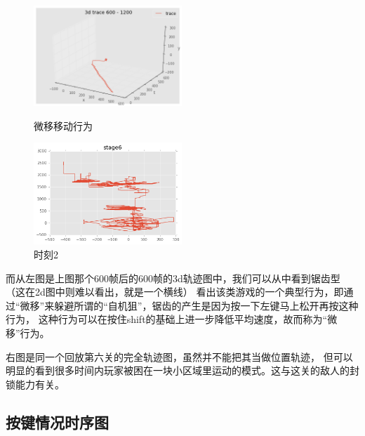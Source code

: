\documentclass[UTF8]{ctexart}
\begin{document}
\begin{figure}[H]
\begin{minipage}[t]{0.5\linewidth}
\centering
\includegraphics[width=2.2in]{images/trace3dsm.png}
\caption{微移移动行为}
\end{minipage}%
\begin{minipage}[t]{0.5\linewidth}
\centering
\includegraphics[width=2.2in]{images/trace2dstage6.png}
\caption{时刻2}
\end{minipage}
\end{figure}

而从左图是上图那个600帧后的600帧的3d轨迹图中，我们可以从中看到锯齿型（这在2d图中则难以看出，就是一个横线）
看出该类游戏的一个典型行为，即通过“微移”来躲避所谓的“自机狙”，锯齿的产生是因为按一下左键马上松开再按这种行为，
这种行为可以在按住shift的基础上进一步降低平均速度，故而称为“微移”行为。

右图是同一个回放第六关的完全轨迹图，虽然并不能把其当做位置轨迹，
但可以明显的看到很多时间内玩家被困在一块小区域里运动的模式。这与这关的敌人的封锁能力有关。

\subsection{按键情况时序图}
\end{document}
